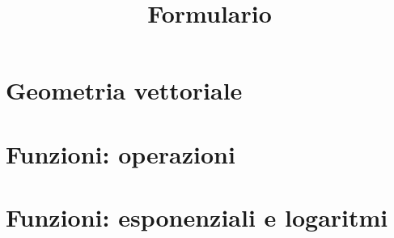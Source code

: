 \documentclass{article}
\title{Formulario}
\begin{document}
\section{Geometria vettoriale}


\section{Funzioni: operazioni}

\section{Funzioni: esponenziali e logaritmi}
\end{document}
